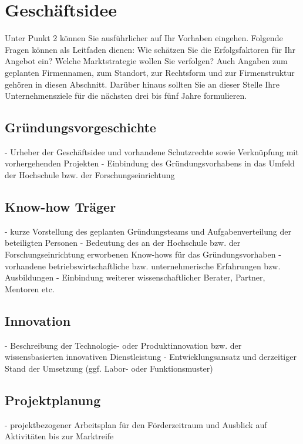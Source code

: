\section{Geschäftsidee}

Unter Punkt 2 können Sie ausführlicher auf Ihr Vorhaben eingehen. Folgende Fragen können als Leitfaden dienen: Wie schätzen Sie die Erfolgsfaktoren für Ihr Angebot ein? Welche Marktstrategie wollen Sie verfolgen? Auch Angaben zum geplanten Firmennamen, zum Standort, zur Rechtsform und zur Firmenstruktur gehören in diesen Abschnitt. Darüber hinaus sollten Sie an dieser Stelle Ihre Unternehmensziele für die nächsten drei bis fünf Jahre formulieren.



\subsection{Gründungsvorgeschichte}

- Urheber der Geschäftsidee und vorhandene Schutzrechte sowie Verknüpfung mit vorhergehenden Projekten
- Einbindung des Gründungsvorhabens in das Umfeld der Hochschule bzw. der Forschungseinrichtung 

\subsection{Know-how Träger}
- kurze Vorstellung des geplanten Gründungsteams und Aufgabenverteilung der beteiligten Personen
- Bedeutung des an der Hochschule bzw. der Forschungseinrichtung erworbenen Know-hows für das   
  Gründungsvorhaben
- vorhandene betriebswirtschaftliche bzw. unternehmerische Erfahrungen bzw. Ausbildungen
- Einbindung weiterer wissenschaftlicher Berater, Partner, Mentoren etc.
\subsection{Innovation}
- Beschreibung der Technologie- oder Produktinnovation bzw. der wissensbasierten innovativen Dienstleistung
- Entwicklungsansatz und derzeitiger Stand der Umsetzung (ggf. Labor- oder Funktionsmuster)

\subsection{Projektplanung}
- projektbezogener Arbeitsplan für den Förderzeitraum und Ausblick auf Aktivitäten bis zur Marktreife
\newpage


